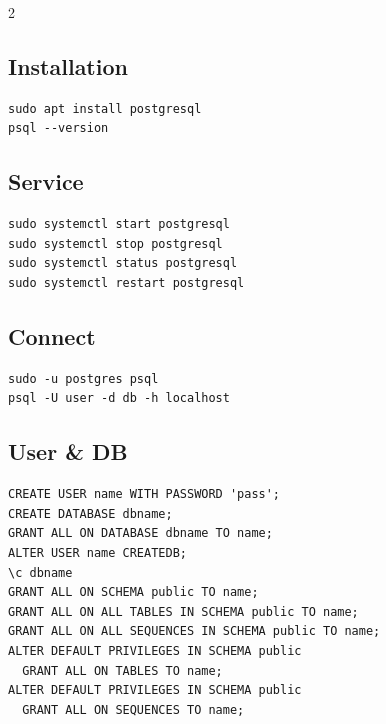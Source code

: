 \documentclass[11pt,a4paper]{article}
\begin{document}
\begin{multicols}{2}

\subsection*{Installation}
\begin{lstlisting}[style=shell,numbers=none]
sudo apt install postgresql
psql --version
\end{lstlisting}

\subsection*{Service}
\begin{lstlisting}[style=shell,numbers=none]
sudo systemctl start postgresql
sudo systemctl stop postgresql
sudo systemctl status postgresql
sudo systemctl restart postgresql
\end{lstlisting}

\columnbreak

\subsection*{Connect}
\begin{lstlisting}[style=shell,numbers=none]
sudo -u postgres psql
psql -U user -d db -h localhost
\end{lstlisting}

\subsection*{User \& DB}
\begin{lstlisting}[style=sql,numbers=none]
CREATE USER name WITH PASSWORD 'pass';
CREATE DATABASE dbname;
GRANT ALL ON DATABASE dbname TO name;
ALTER USER name CREATEDB;
\c dbname
GRANT ALL ON SCHEMA public TO name;
GRANT ALL ON ALL TABLES IN SCHEMA public TO name;
GRANT ALL ON ALL SEQUENCES IN SCHEMA public TO name;
ALTER DEFAULT PRIVILEGES IN SCHEMA public
  GRANT ALL ON TABLES TO name;
ALTER DEFAULT PRIVILEGES IN SCHEMA public
  GRANT ALL ON SEQUENCES TO name;
\end{lstlisting}

\end{multicols}

\vspace{1em}
\end{document}
